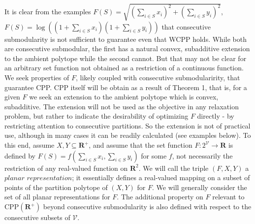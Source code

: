 \documentclass{article}
\theoremstyle{case}
\begin{document}
It is clear from the examples $F(S) = \sqrt{(\sum_{i \in S}x_i)^2 + (\sum_{i \in S}y_i)^2}$, $F(S) = \log{((1+\sum_{i \in S}x_i)(1+\sum_{i \in S}y_i))}$ that consecutive submodularity is not sufficient to guarantee even that WCPP holds. While both are consecutive submodular, the first has a natural convex, subadditive extension to the ambient polytope while the second cannot. But that may not be clear for an arbitrary set function not obtained as a restriction of a continuous function. We seek properties of $F$, likely coupled with consecutive submodularirity, that guarantee CPP. CPP itself will be obtain as a result of Theorem 1, that is, for a given $F$ we seek an extension to the ambient polytope which is convex, subadditive. The extension will not be used as the objective in any relaxation problem, but rather to indicate the desirability of optimizing $F$ directly - by restricting attention to consecutive partitions. So the extension is not of practical use, although in many cases it can be readily calculated (see examples below). 
To this end, assume $X, Y \subseteq \mathbf{R}^+$, and assume that the set function $F\colon 2^{\mathcal{V}} \to \mathbf{R}$ is defined by $F(S) = f(\sum_{i \in S}x_i,\sum_{i \in S}y_i)$ for some $f$, not necessarily the restriction of any real-valued function on $\mathbf{R}^2$. We will call the triple $(F, X, Y)$ a $\textit{planar representation}$; it essentially defines a real-valued mapping on a subset of points of the partition polytope of $(X, Y)$ for $F$. We will generally consider the set of all planar representations for $F$. The additional property on $F$ relevant to CPP$(\mathbf{R}^+)$ beyond consecutive submodularity is also defined with respect to the consecutive subsets of $\mathcal{V}$.
\end{document}
